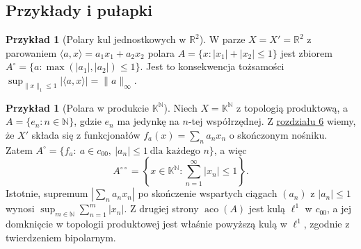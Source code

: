 \documentclass[11pt,a4paper]{article}
\numberwithin{equation}{section}
\theoremstyle{plain}
\theoremstyle{definition}
\newtheorem{przyklad}[twierdzenie]{Przykład}
\theoremstyle{remark}
\newcommand{\R}{\mathbb R}
\newcommand{\N}{\mathbb N}
\newcommand{\K}{\mathbb K}
\begin{document}
\subsection{Przykłady i pułapki}

\begin{przyklad}[Polary kul jednostkowych w $\R^2$]\label{ex:polar-balls}
W parze $X=X'=\R^2$ z parowaniem
$\langle a,x\rangle=a_1x_1+a_2x_2$ polara
$A=\{x:|x_1|+|x_2|\le1\}$ jest zbiorem
$A^\circ=\{a:\max(|a_1|,|a_2|)\le1\}$.
Jest to konsekwencja tożsamości
$\sup_{\|x\|_1\le1}|\langle a,x\rangle|=\|a\|_\infty$.
\begin{center}
\end{center}
\end{przyklad}

\begin{przyklad}[Polara w produkcie $\K^\N$]\label{ex:polar-product}
Niech $X=\K^\N$ z topologią produktową, a
$A=\{e_n:n\in\N\}$, gdzie $e_n$ ma jedynkę na
$n$-tej współrzędnej. Z \hyperref[sec:hahn-banach]{rozdziału 6} wiemy, że $X'$
składa się z funkcjonałów $f_a(x)=\sum_n a_nx_n$
o skończonym nośniku. Zatem
$A^\circ=\{f_a:\ a\in c_{00},\ |a_n|\le1\ \text{dla każdego }n\}$,
a więc
\[
 A^{\circ\circ}=
 \left\{x\in\K^\N:\sum_{n=1}^\infty|x_n|\le1\right\}.
\]
Istotnie, supremum $|\sum_n a_nx_n|$ po
skończenie wspartych ciągach $(a_n)$ z $|a_n|\le1$
wynosi $\sup_{m\in\N}\sum_{n=1}^m|x_n|$. Z drugiej strony
$\operatorname{aco}(A)$ jest kulą $\ell^1$ w $c_{00}$,
a jej domknięcie w topologii produktowej jest właśnie
powyższą kulą w $\ell^1$, zgodnie z twierdzeniem bipolarnym.
\end{przyklad}
\end{document}
